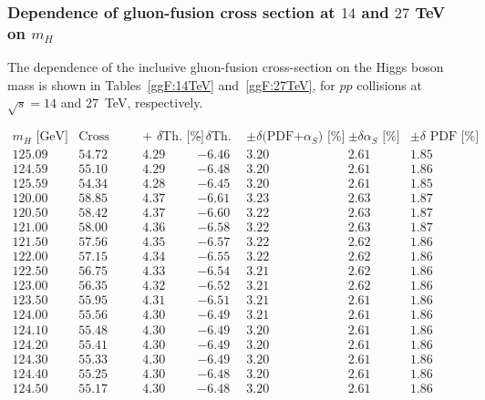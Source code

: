\subsubsection{Dependence of gluon-fusion cross section  at $14$ and $27$ TeV on $m_H$}
\label{sec:ggFmhdep}
The dependence of the inclusive gluon-fusion cross-section on the Higgs boson mass is shown in
Tables~\ref{ggF:14TeV} and~\ref{ggF:27TeV}, for $pp$ collisions at $\sqrt{s}=14$ and 27~TeV, respectively.
\begin{table}[!h]
\begin{center}
\begin{equation}
\begin{array}{|c|c|c|c|c|c|c|}
 \hline
 m_H  \text{ [GeV]}&\text{Cross Section [pb]}&\text{+ $\delta$Th. [\%]}&\text{- $\delta$Th. [\%]}&\pm\delta\text{(PDF+$\alpha_S$) [\%]}& \pm\delta\text{$\alpha_S$ [\%]} & \pm\delta\text{ PDF [\%]}  \\
\hline 
125.09 & 54.72 & 4.29 & -6.46 & 3.20 & 2.61 & 1.85\\
\hline 
124.59 & 55.10 & 4.29 & -6.48 & 3.20 & 2.61 & 1.86\\
\hline 
125.59 & 54.34 & 4.28 & -6.45 & 3.20 & 2.61 & 1.85\\
\hline 
120.00 & 58.85 & 4.37 & -6.61 & 3.23 & 2.63 & 1.87\\
\hline 
120.50 & 58.42 & 4.37 & -6.60 & 3.22 & 2.63 & 1.87\\
\hline 
121.00 & 58.00 & 4.36 & -6.58 & 3.22 & 2.63 & 1.87\\
\hline 
121.50 & 57.56 & 4.35 & -6.57 & 3.22 & 2.62 & 1.86\\
\hline 
122.00 & 57.15 & 4.34 & -6.55 & 3.22 & 2.62 & 1.86\\
\hline 
122.50 & 56.75 & 4.33 & -6.54 & 3.21 & 2.62 & 1.86\\
\hline 
123.00 & 56.35 & 4.32 & -6.52 & 3.21 & 2.62 & 1.86\\
\hline 
123.50 & 55.95 & 4.31 & -6.51 & 3.21 & 2.61 & 1.86\\
\hline 
124.00 & 55.56 & 4.30 & -6.49 & 3.21 & 2.61 & 1.86\\
\hline 
124.10 & 55.48 & 4.30 & -6.49 & 3.20 & 2.61 & 1.86\\
\hline 
124.20 & 55.41 & 4.30 & -6.49 & 3.20 & 2.61 & 1.86\\
\hline 
124.30 & 55.33 & 4.30 & -6.49 & 3.20 & 2.61 & 1.86\\
\hline 
124.40 & 55.25 & 4.30 & -6.48 & 3.20 & 2.61 & 1.86\\
\hline 
124.50 & 55.17 & 4.30 & -6.48 & 3.20 & 2.61 & 1.86\\

\end{array}
\end{equation}
\end{center}
\end{table}
